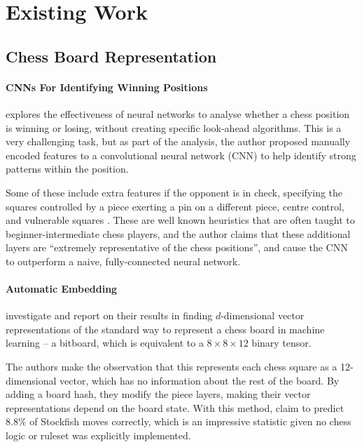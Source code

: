 \section{Existing Work}\label{relatedWorkSection}\label{bg4}

\subsection{Chess Board Representation}

\paragraph{CNNs For Identifying Winning Positions}\citet{chessCNN} explores
the effectiveness of neural networks to analyse whether a chess position is
winning or losing, without creating specific look-ahead algorithms. This is a
very challenging task, but as part of the analysis, the author proposed
manually encoded features to a convolutional neural network (CNN) to help
identify strong patterns within the position. 

Some of these include extra features if the opponent is in check, specifying
the squares controlled by a piece exerting a pin on a different piece, centre
control, and vulnerable squares \citep{chessCNN}. These are well known
heuristics that are often taught to beginner-intermediate chess players, and
the author claims that these additional layers are ``extremely representative
of the chess positions'', and cause the CNN to outperform a naive,
fully-connected neural network.

\paragraph{Automatic Embedding}\citet{chess2vec} investigate and report on
their results in finding $d$-dimensional vector representations of the standard
way to represent a chess board in machine learning -- a bitboard, which is
equivalent to a $8\times8\times12$ binary tensor. 

The authors make the observation that this represents each chess square as a
12-dimensional vector, which has no information about the rest of the board. By
adding a board hash, they modify the piece layers, making their vector
representations depend on the board state. With this method, \citet{chess2vec}
claim to predict $8.8\%$ of Stockfish moves correctly, which is an impressive
statistic given no chess logic or ruleset was explicitly implemented.

